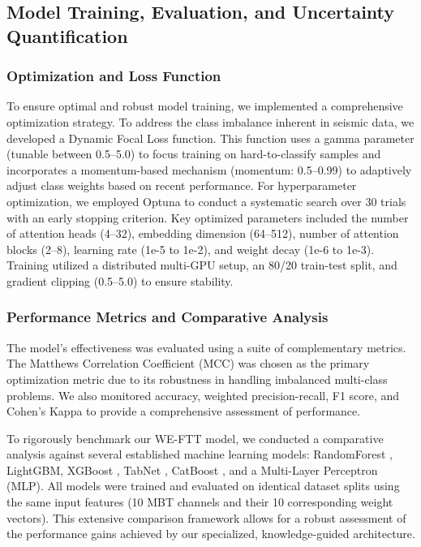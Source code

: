 \documentclass[preprint,review,12pt,authoryear]{elsarticle}
\begin{document}
\subsection{Model Training, Evaluation, and Uncertainty Quantification}\label{sec:model_evaluation}

\subsubsection{Optimization and Loss Function}\label{sec:optimization}
To ensure optimal and robust model training, we implemented a comprehensive optimization strategy. To address the class imbalance inherent in seismic data, we developed a Dynamic Focal Loss function. This function uses a gamma parameter (tunable between 0.5--5.0) to focus training on hard-to-classify samples and incorporates a momentum-based mechanism (momentum: 0.5--0.99) to adaptively adjust class weights based on recent performance. For hyperparameter optimization, we employed Optuna \citep{akibaOptunaNextgenerationHyperparameter2019} to conduct a systematic search over 30 trials with an early stopping criterion. Key optimized parameters included the number of attention heads (4--32), embedding dimension (64--512), number of attention blocks (2--8), learning rate (1e-5 to 1e-2), and weight decay (1e-6 to 1e-3). Training utilized a distributed multi-GPU setup, an 80/20 train-test split, and gradient clipping (0.5--5.0) to ensure stability.

\subsubsection{Performance Metrics and Comparative Analysis}\label{sec:metrics_comparison}
The model's effectiveness was evaluated using a suite of complementary metrics. The Matthews Correlation Coefficient (MCC) \citep{matthewsComparisonPredictedObserved1975} was chosen as the primary optimization metric due to its robustness in handling imbalanced multi-class problems. We also monitored accuracy, weighted precision-recall, F1 score, and Cohen's Kappa \citep{cohenCoefficientAgreementNominal1960} to provide a comprehensive assessment of performance.

To rigorously benchmark our WE-FTT model, we conducted a comparative analysis against several established machine learning models: RandomForest \citep{breiman2001random}, LightGBM, XGBoost \citep{chen2016xgboost}, TabNet \citep{arikTabNetAttentiveInterpretable2021}, CatBoost \citep{prokhorenkovaCatBoostUnbiasedBoosting2018}, and a Multi-Layer Perceptron (MLP). All models were trained and evaluated on identical dataset splits using the same input features (10 MBT channels and their 10 corresponding weight vectors). This extensive comparison framework allows for a robust assessment of the performance gains achieved by our specialized, knowledge-guided architecture.
\end{document}
